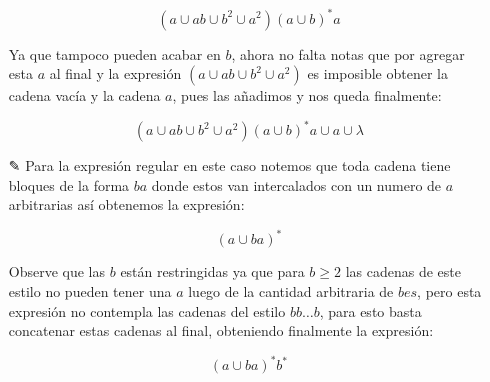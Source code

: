 \begin{itemize}
    $$(a\cup ab \cup b^2 \cup a^2)(a \cup b)^*a $$

    Ya que tampoco pueden acabar en $b$, ahora no falta notas que por agregar esta $a$ al final y la expresión $(a\cup ab \cup b^2 \cup a^2)$ es imposible obtener la cadena vacía y la cadena $a$, pues las añadimos y nos queda finalmente:

     $$(a\cup ab \cup b^2 \cup a^2)(a \cup b)^*a \cup a \cup \lambda$$

     \item[✎] Para la expresión regular en este caso notemos que toda cadena tiene bloques de la forma $ba$ donde estos van intercalados con un numero de $a$ arbitrarias así obtenemos la expresión:

     $$(a\cup ba)^*$$

     Observe que las $b$ están restringidas ya que para $b\geq 2$ las cadenas de este estilo no pueden tener una $a$ luego de la cantidad arbitraria de $bes$, pero esta expresión no contempla las cadenas del estilo $bb\dots b$, para esto basta concatenar estas cadenas al final, obteniendo finalmente la expresión:

     $$(a\cup ba)^*b^*$$

\end{itemize}

